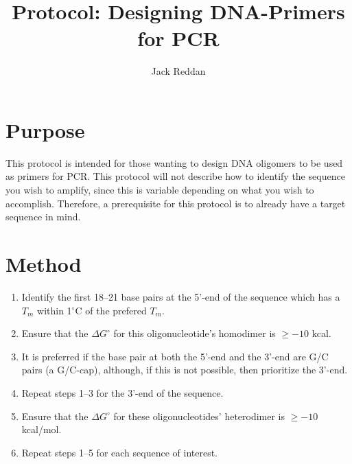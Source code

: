 \documentclass[twocolumn]{article}
\begin{document}
\title{\vspace{-2cm}Protocol: Designing DNA-Primers for PCR}
\author{Jack Reddan}

\maketitle{}


\section{Purpose}
This protocol is intended for those wanting to design DNA oligomers to be used as primers for PCR.
This protocol will not describe how to identify the sequence you wish to amplify,
since this is variable depending on what you wish to accomplish.
Therefore, a prerequisite for this protocol is to already have a target sequence in mind.

\section{Method}
\begin{enumerate}
	\item Identify the first 18--21 base pairs at the 5'-end of the sequence which has a $T_m$ within 1$^\circ$C of the prefered $T_m$.
	\item Ensure that the $\Delta G^\circ$ for this oligonucleotide's homodimer is $\ge -10$ kcal.
	\item It is preferred if the base pair at both the 5'-end and the 3'-end are G/C pairs (a G/C-cap), although, if this is not possible, then prioritize the 3'-end.
	\item Repeat steps 1--3 for the 3'-end of the sequence.
	\item Ensure that the $\Delta G^\circ$ for these oligonucleotides' heterodimer is $\ge -10$ kcal/mol.
	\item Repeat steps 1--5 for each sequence of interest.
\end{enumerate}
\end{document}
